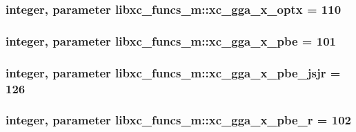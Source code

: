 \hypertarget{classlibxc__funcs__m_a5dae05e7bd289ca5703105670c5dc7c6}{
\subsubsection[{xc\-\_\-gga\-\_\-x\-\_\-optx}]{\setlength{\rightskip}{0pt plus 5cm}integer, parameter libxc\-\_\-funcs\-\_\-m\-::xc\-\_\-gga\-\_\-x\-\_\-optx = 110}}\label{classlibxc__funcs__m_a5dae05e7bd289ca5703105670c5dc7c6}
\hypertarget{classlibxc__funcs__m_ab9658d43ef44bb4ff2b9f308e741ab53}{
\subsubsection[{xc\-\_\-gga\-\_\-x\-\_\-pbe}]{\setlength{\rightskip}{0pt plus 5cm}integer, parameter libxc\-\_\-funcs\-\_\-m\-::xc\-\_\-gga\-\_\-x\-\_\-pbe = 101}}\label{classlibxc__funcs__m_ab9658d43ef44bb4ff2b9f308e741ab53}
\hypertarget{classlibxc__funcs__m_adb80ebb4de8d6df67a73d5d3b8acfda4}{
\subsubsection[{xc\-\_\-gga\-\_\-x\-\_\-pbe\-\_\-jsjr}]{\setlength{\rightskip}{0pt plus 5cm}integer, parameter libxc\-\_\-funcs\-\_\-m\-::xc\-\_\-gga\-\_\-x\-\_\-pbe\-\_\-jsjr = 126}}\label{classlibxc__funcs__m_adb80ebb4de8d6df67a73d5d3b8acfda4}
\hypertarget{classlibxc__funcs__m_ad32b9aeb7293da870cc16af08eda3d49}{
\subsubsection[{xc\-\_\-gga\-\_\-x\-\_\-pbe\-\_\-r}]{\setlength{\rightskip}{0pt plus 5cm}integer, parameter libxc\-\_\-funcs\-\_\-m\-::xc\-\_\-gga\-\_\-x\-\_\-pbe\-\_\-r = 102}}\label{classlibxc__funcs__m_ad32b9aeb7293da870cc16af08eda3d49}
